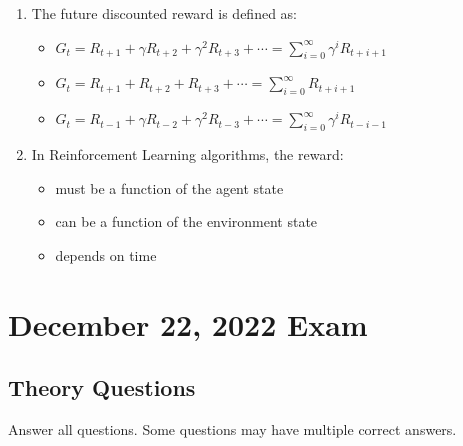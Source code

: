 \documentclass[openany]{book}
\theoremstyle{definition}
\theoremstyle{remark}
\begin{document}
\begin{enumerate}
    \item The future discounted reward is defined as:
    \begin{itemize}
        \item[\checkmark] $G_t = R_{t+1} + \gamma R_{t+2} + \gamma^2R_{t+3} + \cdots = \sum_{i=0}^\infty \gamma^i R_{t+i+1}$
        \item[] $G_t = R_{t+1} + R_{t+2} + R_{t+3} + \cdots = \sum_{i=0}^\infty R_{t+i+1}$
        \item[] $G_t = R_{t-1} + \gamma R_{t-2} + \gamma^2R_{t-3} + \cdots = \sum_{i=0}^\infty \gamma^i R_{t-i-1}$
    \end{itemize}

    \item In Reinforcement Learning algorithms, the reward:
    \begin{itemize}
        \item[] must be a function of the agent state
        \item[\checkmark] can be a function of the environment state
        \item[] depends on time
    \end{itemize}
\end{enumerate}

\chapter{December 22, 2022 Exam}

\section*{Theory Questions}
Answer all questions. Some questions may have multiple correct answers.
\end{document}
